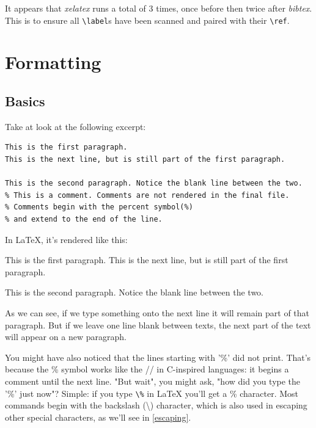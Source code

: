 \documentclass[en,inscr,ack,preface]{dimscthesis}
\begin{document}
It appears that \textit{xelatex} runs a total of 3 times, once before then twice after \textit{bibtex}.
This is to ensure all \verb|\label|s have been scanned and paired with their \verb|\ref|.

\section{Formatting} \label{formatting}

\subsection{Basics} \label{basics}

Take at look at the following excerpt:

\begin{verbatim}
This is the first paragraph.
This is the next line, but is still part of the first paragraph.

This is the second paragraph. Notice the blank line between the two.
% This is a comment. Comments are not rendered in the final file.
% Comments begin with the percent symbol(%)
% and extend to the end of the line.
\end{verbatim}

In \LaTeX{}, it's rendered like this:

This is the first paragraph.
This is the next line, but is still part of the first paragraph.

This is the second paragraph. Notice the blank line between the two.

As we can see, if we type something onto the next line it will remain part of that paragraph.
But if we leave one line blank between texts, the next part of the text will appear on a new paragraph.

You might have also noticed that the lines starting with '\%' did not print.
That's because the \% symbol works like the // in C-inspired languages: it begins a comment until the next line.
"But wait", you might ask, "how did you type the '\%' just now"?
Simple: if you type \verb|\%| in \LaTeX{} you'll get a \% character.
Most commands begin with the backslash (\textbackslash) character, which is also used in escaping other special characters, as we'll see in \ref{escaping}.
\end{document}
